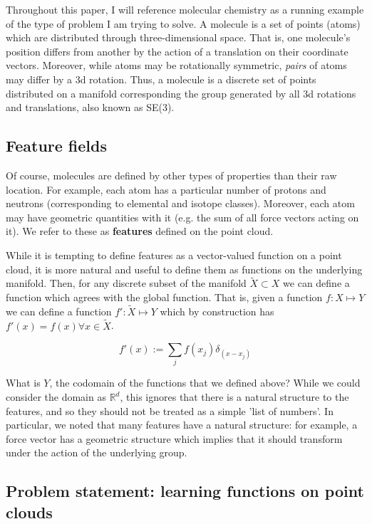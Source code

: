 \documentclass[12pt]{article}
\begin{document}
Throughout this paper, I will reference molecular chemistry as a running example of the type of problem I am trying to solve. A molecule is a set of points (atoms) which are distributed through three-dimensional space. That is, one molecule's position differs from another by the action of a translation on their coordinate vectors. Moreover, while atoms may be rotationally symmetric, \textit{pairs} of atoms may differ by a 3d rotation. Thus, a molecule is a discrete set of points distributed on a manifold corresponding the group generated by all 3d rotations and translations, also known as SE(3).   

\subsection{Feature fields}
Of course, molecules are defined by other types of properties than their raw location. For example, each atom has a particular number of protons and neutrons (corresponding to elemental and isotope classes). Moreover, each atom may have geometric quantities with it (e.g. the sum of all force vectors acting on it). We refer to these as \textbf{features} defined on the point cloud.

While it is tempting to define features as a vector-valued function on a point cloud, it is more natural and useful to define them as functions on the underlying manifold. Then, for any discrete subset of the manifold $\tilde{X} \subset X$ we can define a function which agrees with the global function. That is, given a function $f: X \mapsto Y$ we can define a function $f': \tilde{X} \mapsto Y$ which by construction has $f'(x) = f(x) \forall x \in \tilde{X}$.

$$ f'(x) := \sum_j f(x_j)\delta_(x - x_j)$$

What is $Y$, the codomain of the functions that we defined above? While we could consider the domain as $\mathbb{R}^d$, this ignores that there is a natural structure to the features, and so they should not be treated as a simple 'list of numbers'. In particular, we noted that many features have a natural structure: for example, a force vector has a geometric structure which implies that it should transform under the action of the underlying group. 


\subsection*{Problem statement: learning functions on point clouds}
\end{document}
